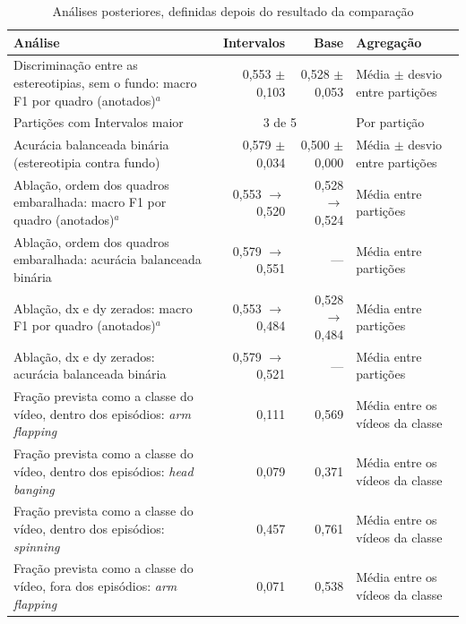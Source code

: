 
\begin{table}[htbp]
\centering
\footnotesize
\caption{Análises posteriores, definidas depois do resultado da comparação}
\label{tab:posteriores}
\begin{tabular}{p{5.4cm}rrp{2.8cm}}
\toprule
Análise & Intervalos & Base & Agregação \\
\midrule
Discriminação entre as estereotipias, sem o fundo: macro F1 por quadro (anotados)$^{a}$ & 0,553 $\pm$ 0,103 & 0,528 $\pm$ 0,053 & Média $\pm$ desvio entre partições \\
Partições com Intervalos maior & \multicolumn{2}{c}{3 de 5} & Por partição \\
\midrule
Acurácia balanceada binária (estereotipia contra fundo) & 0,579 $\pm$ 0,034 & 0,500 $\pm$ 0,000 & Média $\pm$ desvio entre partições \\
\midrule
Ablação, ordem dos quadros embaralhada: macro F1 por quadro (anotados)$^{a}$ & 0,553 $\rightarrow$ 0,520 & 0,528 $\rightarrow$ 0,524 & Média entre partições \\
Ablação, ordem dos quadros embaralhada: acurácia balanceada binária & 0,579 $\rightarrow$ 0,551 & --- & Média entre partições \\
Ablação, dx e dy zerados: macro F1 por quadro (anotados)$^{a}$ & 0,553 $\rightarrow$ 0,484 & 0,528 $\rightarrow$ 0,484 & Média entre partições \\
Ablação, dx e dy zerados: acurácia balanceada binária & 0,579 $\rightarrow$ 0,521 & --- & Média entre partições \\
\midrule
Fração prevista como a classe do vídeo, dentro dos episódios: \textit{arm flapping} & 0,111 & 0,569 & Média entre os vídeos da classe \\
Fração prevista como a classe do vídeo, dentro dos episódios: \textit{head banging} & 0,079 & 0,371 & Média entre os vídeos da classe \\
Fração prevista como a classe do vídeo, dentro dos episódios: \textit{spinning} & 0,457 & 0,761 & Média entre os vídeos da classe \\
Fração prevista como a classe do vídeo, fora dos episódios: \textit{arm flapping} & 0,071 & 0,538 & Média entre os vídeos da classe \\

\end{tabular}
\end{table}
